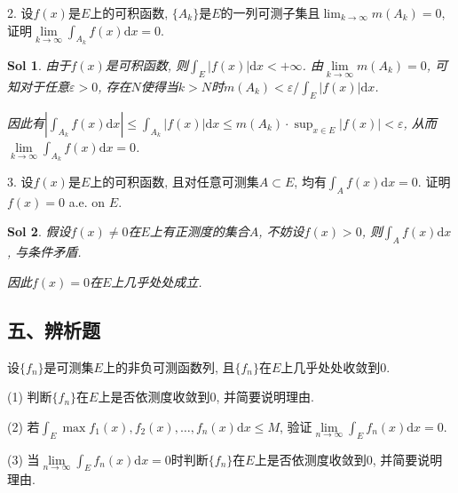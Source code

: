 \documentclass[UTF8]{article}
\newtheorem{solution}{Sol}
\begin{document}
  2. 设$f(x)$是$E$上的可积函数, $\{A_k\}$是$E$的一列可测子集且$\lim_{k \to \infty}m(A_k)=0$, 证明$\lim \limits_{k \to \infty}\int_{A_k}f(x)\mathrm{d}x=0$.\par
    
  \begin{solution}
    由于$f(x)$是可积函数, 则$\int_{E}|f(x)|\mathrm{d}x<+\infty$. 由$\lim \limits_{k \to \infty}m(A_k)=0$, 可知对于任意$\varepsilon >0$, 存在$N$使得当$k>N$时$m(A_k)<\varepsilon/\int_{E}|f(x)|\mathrm{d}x$.\par
    因此有$\left|\int_{A_k}f(x)\mathrm{d}x\right|\leqslant \int_{A_k}|f(x)|\mathrm{d}x\leqslant m(A_k)\cdot \sup_{x\in E}|f(x)|<\varepsilon$, 从而$\lim \limits_{k \to \infty}\int_{A_k}f(x)\mathrm{d}x=0$.\par
  \end{solution}

  3. 设$f(x)$是$E$上的可积函数, 且对任意可测集$A\subset E$, 均有$\int_{A}f(x)\mathrm{d}x=0$. 证明$f(x)=0$ a.e. on $E$.\par

  \begin{solution}
    假设$f(x)\neq 0$在$E$上有正测度的集合$A$, 不妨设$f(x)>0$, 则$\int_{A}f(x)\mathrm{d}x$, 与条件矛盾.\par
    因此$f(x)=0$在$E$上几乎处处成立.\par
  \end{solution}

  \subsection*{五、辨析题}

  设$\{f_n\}$是可测集$E$上的非负可测函数列, 且$\{f_n\}$在$E$上几乎处处收敛到$0$.\par
  (1) 判断$\{f_n\}$在$E$上是否依测度收敛到$0$, 并简要说明理由.\par
  (2) 若$\int_{E} \max{f_1(x),f_2(x),\ldots,f_n(x)}\mathrm{d}x\leqslant M$, 验证$\lim \limits_{n \to \infty}\int_{E}f_n(x)\mathrm{d}x=0$.\par
  (3) 当$\lim \limits_{n \to \infty}\int_{E}f_n(x)\mathrm{d}x=0$时判断$\{f_n\}$在$E$上是否依测度收敛到$0$, 并简要说明理由.\par
\end{document}
